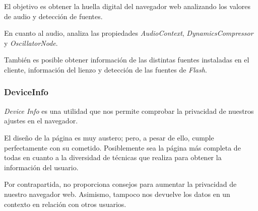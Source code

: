 El objetivo es obtener la huella digital del navegador web analizando los valores de audio y detección de fuentes. \par 

En cuanto al audio, analiza las propiedades \textit{AudioContext}, \textit{DynamicsCompressor} y \textit{OscillatorNode}. \par 

También es posible obtener información de las distintas fuentes instaladas en el cliente, información del lienzo y detección de las fuentes de \textit{Flash}. \par 

\subsubsection{DeviceInfo}

\textit{Device Info}\cite{deviceinfo} es una utilidad que nos permite comprobar la privacidad de nuestros ajustes en el navegador. \par

El diseño de la página es muy austero; pero, a pesar de ello, cumple perfectamente con su cometido. Posiblemente sea la página más completa de todas en cuanto a la diversidad de técnicas que realiza para obtener la información del usuario. \par

Por contrapartida, no proporciona consejos para aumentar la privacidad de nuestro navegador web. Asimismo, tampoco nos devuelve los datos en un contexto en relación con otros usuarios. \par

